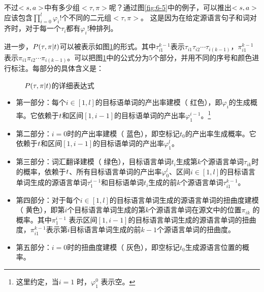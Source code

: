 \parinterval 不过$<{s},{a}>$中有多少组$<\tau,\pi>$呢？通过图\ref{fig:6-5}中的例子，可以推出$<{s},{a}>$应该包含$\prod_{i=0}^{l}{\varphi_i !}$个不同的二元组$<\tau,\pi>$。 这是因为在给定源语言句子和词对齐时，对于每一个$\tau_i$都有$\varphi_{i}!$种排列。


\parinterval 进一步，${P}(\tau,\pi|{t})$可以被表示如图\ref{fig:6-7}的形式。其中$\tau_{i1}^{k-1}$表示$\tau_{i1}\tau_{i2}\cdots \tau_{i(k-1)}$，$\pi_{i1}^{ k-1}$表示$\pi_{i1}\pi_{i2}\cdots \pi_{i(k-1)}$。可以把图\ref{fig:6-7}中的公式分为5个部分，并用不同的序号和颜色进行标注。每部分的具体含义是：

\begin{figure}[htp]
    \centering

   \caption{{${P}(\tau,\pi|t)$}的详细表达式}
\setlength{\belowcaptionskip}{-0.5em}
   \label{fig:6-7}
\end{figure}

\begin{itemize}
\vspace{0.5em}
\item 第一部分：每个$i\in[1,l]$的目标语单词的产出率建模（{\color{red!70} 红色}），即$\varphi_i$的生成概率。它依赖于${t}$和区间$[1,i-1]$的目标语单词的产出率$\varphi_1^{i-1}$。\footnote{这里约定，当$i=1$ 时，$\varphi_1^0$ 表示空。}
\vspace{0.5em}
\item 第二部分：$i=0$时的产出率建模（{\color{blue!70} 蓝色}），即空标记$t_0$的产出率生成概率。它依赖于${t}$和区间$[1,i-1]$的目标语单词的产出率$\varphi_1^l$。
\vspace{0.5em}
\item 第三部分：词汇翻译建模（{\color{green!70} 绿色}），目标语言单词$t_i$生成第$k$个源语言单词$\tau_{ik}$时的概率，依赖于${t}$、所有目标语言单词的产出率$\varphi_0^l$、区间$i\in[1,l]$的目标语言单词生成的源语言单词$\tau_1^{i-1}$和目标语单词$t_i$生成的前$k$个源语言单词$\tau_{i1}^{k-1}$。
\vspace{0.5em}
\item 第四部分：对于每个$i\in[1,l]$的目标语言单词生成的源语言单词的扭曲度建模（{\color{yellow!70!black} 黄色}），即第$i$个目标语言单词生成的第$k$个源语言单词在源文中的位置$\pi_{ik}$ 的概率。其中$\pi_1^{i-1}$ 表示区间$[1,i-1]$的目标语言单词生成的源语言单词的扭曲度，$\pi_{i1}^{k-1}$表示第$i$目标语言单词生成的前$k-1$个源语言单词的扭曲度。
\vspace{0.5em}
\item 第五部分：$i=0$时的扭曲度建模（{\color{gray!70} 灰色}），即空标记$t_0$生成源语言位置的概率。
\end{itemize}

